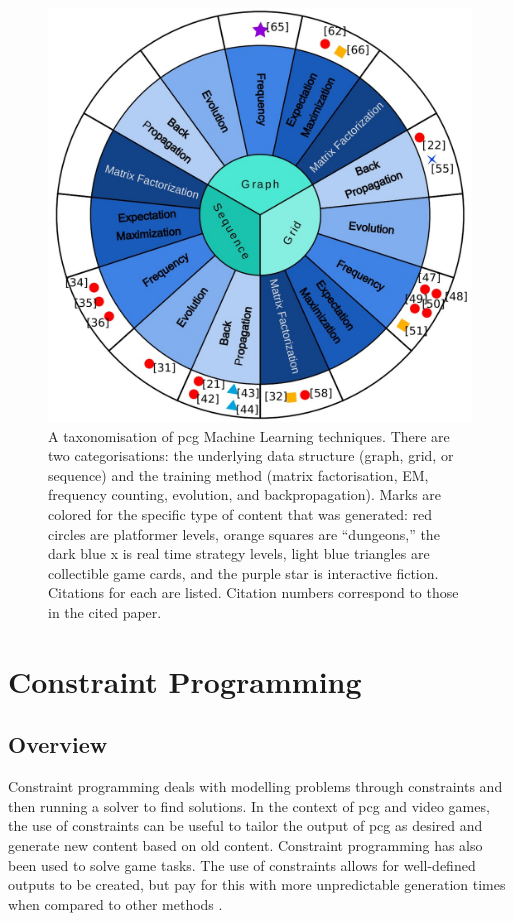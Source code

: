 \begin{figure}[H]
    \centering
    \includegraphics[width=\textwidth, height=0.5\textheight, keepaspectratio]{Images/PCGMLTaxonomy.jpg}
    \caption{A taxonomisation of \acrlong{pcg} Machine Learning techniques. There are two categorisations: the underlying data structure (graph, grid, or sequence) and the training method (matrix factorisation, EM, frequency counting, evolution, and backpropagation). Marks are colored for the specific type of content that was generated: red circles are platformer levels, orange squares are ``dungeons,'' the dark blue x is real time strategy levels, light blue triangles are collectible game cards, and the purple star is interactive fiction. Citations for each are listed. Citation numbers correspond to those in the cited paper. \cite{PCGML}}
    \label{fig:pcgml}
\end{figure}



\section{Constraint Programming}
\subsection{Overview}
Constraint programming deals with modelling problems through constraints and then running a solver to find solutions. In the context of \acrshort{pcg} and video games, the use of constraints can be useful to tailor the output of \acrshort{pcg} as desired and generate new content based on old content. Constraint programming has also been used to solve game tasks. The use of constraints allows for well-defined outputs to be created, but pay for this with more unpredictable generation times when compared to other methods \cite{WFC_In_The_Wild}.

